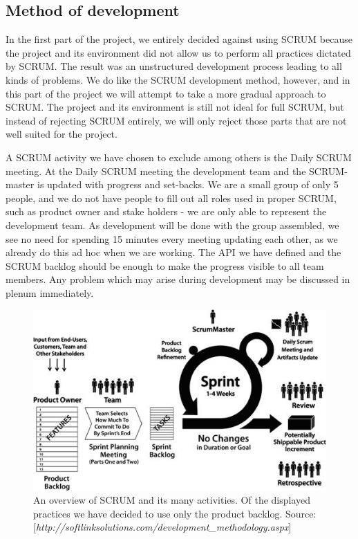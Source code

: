 \subsection{Method of development}
In the first part of the project, we entirely decided against using SCRUM because the project and its environment did not allow us to perform all practices dictated by SCRUM. The result was an unstructured development process leading to all kinds of problems.
We do like the SCRUM development method, however, and in this part of the project we will attempt to take a more gradual approach to SCRUM. The project and its environment is still not ideal for full SCRUM, but instead of rejecting SCRUM entirely, we will only reject those parts that are not well suited for the project.

A SCRUM activity we have chosen to exclude among others is the Daily SCRUM meeting.
At the Daily SCRUM meeting the development team and the SCRUM-master is updated with progress and set-backs.
We are a small group of only 5 people, and we do not have people to fill out all roles used in proper SCRUM, such as product owner and stake holders - we are only able to represent the development team.
As development will be done with the group assembled, we see no need for spending 15 minutes every meeting updating each other, as we already do this ad hoc when we are working.
The API we have defined and the SCRUM backlog should be enough to make the progress visible to all team members. Any problem which may arise during development may be discussed in plenum immediately.

\begin{figure}[t]
  \includegraphics[width=\textwidth]{illustrations/scrum.jpg}
  \caption{An overview of SCRUM and its many activities. Of the displayed practices we have decided to use only the product backlog. Source: [\textit{http://softlinksolutions.com/development\_methodology.aspx}]}
  \label{scrum_picture}
\end{figure}

